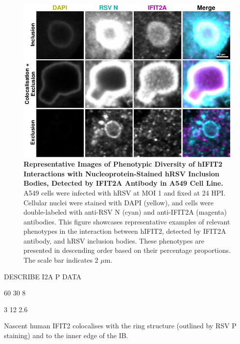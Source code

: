 \begin{figure}
    \centering
    \includegraphics[width=1\linewidth]{08. Chapter 3/Figs/02. Infection/02. IFIT2/01. IFIT2A/03. i2a a549 hrsv n.pdf}
    \caption[Representative Images of Phenotypic Diversity of hIFIT2 Interactions with Nucleoprotein-Stained hRSV Inclusion Bodies, Detected by IFIT2A Antibody in A549 Cell Line.]{\textbf{Representative Images of Phenotypic Diversity of hIFIT2 Interactions with Nucleoprotein-Stained hRSV Inclusion Bodies, Detected by IFIT2A Antibody in A549 Cell Line.} A549 cells were infected with hRSV at MOI 1 and fixed at 24 HPI. Cellular nuclei were stained with DAPI (yellow), and cells were double-labeled with anti-RSV N (cyan) and anti-IFIT2A (magenta) antibodies. This figure showcases representative examples of relevant phenotypes in the interaction between hIFIT2, detected by IFIT2A antibody, and hRSV inclusion bodies. These phenotypes are presented in descending order based on their percentage proportions. The scale bar indicates 2 \(\mu \mbox{m}\).}
    \label{fig:Representative Images of Phenotypic Diversity of hIFIT2 Interactions with Nucleoprotein-Stained hRSV Inclusion Bodies, Detected by IFIT2A Antibody in A549 Cell Line}
\end{figure}

DESCRIBE I2A P DATA

60 30 8

3 12 2.6

Nascent human IFIT2 colocalises with the ring structure (outlined by RSV P staining) and to the inner edge of the IB.

